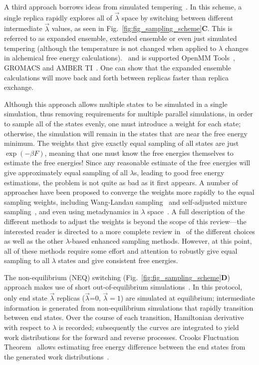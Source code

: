 \documentclass[9pt,bestpractices]{livecoms}
\begin{document}
A third approach borrows ideas from simulated tempering~\cite{marinari1992simulated}. In this scheme, a single replica rapidly explores all of $\vec{\lambda}$ space by switching between different intermediate $\vec{\lambda}$ values, as seen in Fig.~\ref{fig:fig_sampling_scheme}\textbf{C}.  This is referred to as expanded ensemble, extended ensemble or even just simulated tempering (although the temperature is not changed when applied to $\lambda$ changes in alchemical free energy calculations).~\cite{lyubartsev1992new, li2007simulated, tan2017optimally} and is supported OpenMM Tools~\cite{andrearizzi2019choderalab}, GROMACS and AMBER TI~\cite{Lee_JPhysChemB_2025_v129_p13063}.    One can show that the expanded ensemble calculations will move back and forth between replicas faster than replica exchange.~\cite{Zhang:JCP:2008}  

Although this approach allows multiple states to be simulated in a single simulation, thus removing requirements for multiple parallel simulations, in order to sample all of the states evenly, one must introduce a weight for each state; otherwise, the simulation will remain in the states that are near the free energy minimum. The weights that give exactly equal sampling of all states are just $\exp(-\beta F)$, meaning that one must know the free energies themselves to estimate the free energies!  Since any reasonable estimate of the free energies will give approximately equal sampling of all $\lambda$s, leading to good free energy estimations, the problem is not quite as bad as it first appears. A number of approaches have been proposed to converge the weights more rapidly to the equal sampling weights, including Wang-Landau sampling~\cite{Wang:PRL:2001} and self-adjusted mixture sampling~\cite{tan2017optimally}, and even using metadynamics in $\lambda$ space~\cite{Hsu:JCTC:2023}. A full description of the different methods to adjust the weights is beyond the scope of this review---the interested reader is directed to a more complete review in~\cite{Henin:LJCMS:2022} of the different choices as well as the other $\lambda$-based enhanced sampling methods.  However, at this point, all of these methods require some effort and attention to robustly give equal sampling to all $\lambda$ states and give consistent free energies.

The non-equilibrium (NEQ) switching (Fig.~\ref{fig:fig_sampling_scheme}\textbf{D}) approach makes use of short out-of-equilibrium simulations~\cite{aldeghi2018accurate}. In this protocol, only end state $\vec{\lambda}$ replicas ($\vec{\lambda}$=0, $\vec{\lambda}=1$) are simulated at equilibrium; intermediate information is generated from non-equilibrium simulations that rapidly transition between end states. 
Over the course of each transition, Hamiltonian derivative with respect to $\lambda$ is recorded; subsequently the curves are integrated to yield work distributions for the forward and reverse processes. Crooks Fluctuation Theorem~\cite{crooks1999entropy} allows estimating free energy difference between the end states from the generated work distributions~\cite{shirts2003equilibrium}.
\end{document}
